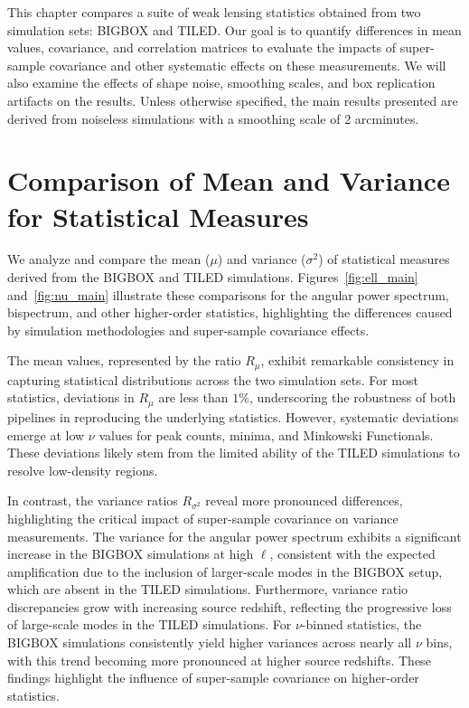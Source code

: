This chapter compares a suite of weak lensing statistics obtained from two simulation sets: BIGBOX and TILED. Our goal is to quantify differences in mean values, covariance, and correlation matrices to evaluate the impacts of super-sample covariance and other systematic effects on these measurements. We will also examine the effects of shape noise, smoothing scales, and box replication artifacts on the results. Unless otherwise specified, the main results presented are derived from noiseless simulations with a smoothing scale of 2 arcminutes.

\section{Comparison of Mean and Variance for Statistical Measures}
We analyze and compare the mean ($\mu$) and variance ($\sigma^2$) of statistical measures derived from the BIGBOX and TILED simulations. Figures~\ref{fig:ell_main} and~\ref{fig:nu_main} illustrate these comparisons for the angular power spectrum, bispectrum, and other higher-order statistics, highlighting the differences caused by simulation methodologies and super-sample covariance effects.

The mean values, represented by the ratio $R_{\mu}$, exhibit remarkable consistency in capturing statistical distributions across the two simulation sets. For most statistics, deviations in $R_{\mu}$ are less than $1\%$, underscoring the robustness of both pipelines in reproducing the underlying statistics. However, systematic deviations emerge at low $\nu$ values for peak counts, minima, and Minkowski Functionals. These deviations likely stem from the limited ability of the TILED simulations to resolve low-density regions.

In contrast, the variance ratios $R_{\sigma^2}$ reveal more pronounced differences, highlighting the critical impact of super-sample covariance on variance measurements. The variance for the angular power spectrum exhibits a significant increase in the BIGBOX simulations at high $\ell$, consistent with the expected amplification due to the inclusion of larger-scale modes in the BIGBOX setup, which are absent in the TILED simulations. Furthermore, variance ratio discrepancies grow with increasing source redshift, reflecting the progressive loss of large-scale modes in the TILED simulations. For $\nu$-binned statistics, the BIGBOX simulations consistently yield higher variances across nearly all $\nu$ bins, with this trend becoming more pronounced at higher source redshifts. These findings highlight the influence of super-sample covariance on higher-order statistics. 


